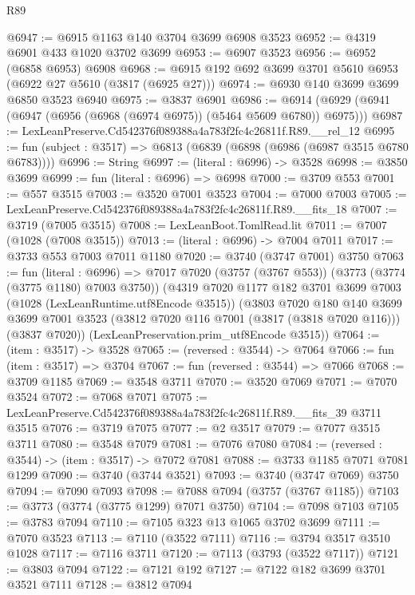 \begin{lexlean}{R89}
\begin{coremodule}
@6947 := @6915 @1163 @140 @3704 @3699 @6908 @3523
@6952 := @4319 @6901 @433 @1020 @3702 @3699
@6953 := @6907 @3523
@6956 := @6952 (@6858 @6953) @6908
@6968 := @6915 @192 @692 @3699 @3701 @5610 @6953 (@6922 @27 @5610 (@3817 (@6925 @27)))
@6974 := @6930 @140 @3699 @3699 @6850 @3523 @6940
@6975 := @3837 @6901
@6986 := @6914 (@6929 (@6941 (@6947 (@6956 (@6968 (@6974 @6975)) (@5464 @5609 @6780)) @6975)))
@6987 := LexLeanPreserve.Cd542376f089388a4a783f2fc4c26811f.R89.__rel_12
@6995 := fun (subject : @3517) => @6813 (@6839 (@6898 (@6986 (@6987 @3515 @6780 @6783))))
@6996 := String
@6997 := (literal : @6996) -> @3528
@6998 := @3850 @3699
@6999 := fun (literal : @6996) => @6998
@7000 := @3709 @553
@7001 := @557 @3515
@7003 := @3520 @7001 @3523
@7004 := @7000 @7003
@7005 := LexLeanPreserve.Cd542376f089388a4a783f2fc4c26811f.R89.__fits_18
@7007 := @3719 (@7005 @3515)
@7008 := LexLeanBoot.TomlRead.lit
@7011 := @7007 (@1028 (@7008 @3515))
@7013 := (literal : @6996) -> @7004 @7011
@7017 := @3733 @553 @7003 @7011 @1180
@7020 := @3740 (@3747 @7001) @3750
@7063 := fun (literal : @6996) =>
  @7017
    @7020
    (@3757 (@3767 @553))
    (@3773 (@3774 (@3775 @1180) @7003 @3750))
    (@4319
      @7020
      @1177
      @182
      @3701
      @3699
      @7003
      (@1028 (LexLeanRuntime.utf8Encode @3515))
      (@3803
        @7020
        @180
        @140
        @3699
        @3699
        @7001
        @3523
        (@3812 @7020 @116 @7001 (@3817 (@3818 @7020 @116)))
        (@3837 @7020))
      (LexLeanPreservation.prim_utf8Encode @3515))
@7064 := (item : @3517) -> @3528
@7065 := (reversed : @3544) -> @7064
@7066 := fun (item : @3517) => @3704
@7067 := fun (reversed : @3544) => @7066
@7068 := @3709 @1185
@7069 := @3548 @3711
@7070 := @3520 @7069
@7071 := @7070 @3524
@7072 := @7068 @7071
@7075 := LexLeanPreserve.Cd542376f089388a4a783f2fc4c26811f.R89.__fits_39 @3711 @3515
@7076 := @3719 @7075
@7077 := @2 @3517
@7079 := @7077 @3515 @3711
@7080 := @3548 @7079
@7081 := @7076 @7080
@7084 := (reversed : @3544) -> (item : @3517) -> @7072 @7081
@7088 := @3733 @1185 @7071 @7081 @1299
@7090 := @3740 (@3744 @3521)
@7093 := @3740 (@3747 @7069) @3750
@7094 := @7090 @7093
@7098 := @7088 @7094 (@3757 (@3767 @1185))
@7103 := @3773 (@3774 (@3775 @1299) @7071 @3750)
@7104 := @7098 @7103
@7105 := @3783 @7094
@7110 := @7105 @323 @13 @1065 @3702 @3699
@7111 := @7070 @3523
@7113 := @7110 (@3522 @7111)
@7116 := @3794 @3517 @3510 @1028
@7117 := @7116 @3711
@7120 := @7113 (@3793 (@3522 @7117))
@7121 := @3803 @7094
@7122 := @7121 @192
@7127 := @7122 @182 @3699 @3701 @3521 @7111
@7128 := @3812 @7094

\end{coremodule}
\end{lexlean}
